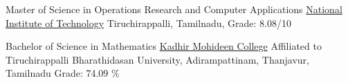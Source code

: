 {Master of Science in Operations Research and Computer Applications}
{\href{https://www.nitt.edu/}{National Institute of Technology}}
{Tiruchirappalli, Tamilnadu, \Large{}}
{\small{Grade: 8.08/10}}
{}

\vspace{1pt}

{Bachelor of Science in Mathematics}
{\href{https://kmc.edu.in/}{Kadhir Mohideen College}}
{Affiliated to Tiruchirappalli Bharathidasan University, Adirampattinam, Thanjavur, Tamilnadu \Large{}}
{\small{Grade: 74.09 \%}}
{}
